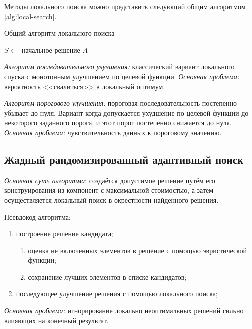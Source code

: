 Методы локального поиска можно представить следующий общим алгоритмом \ref{alg:local-search}.
\begin{algorithm}[ht!]
    \caption{Общий алгоритм локального поиска}
    \( S \leftarrow \) начальное решение \( A \)\;
    \label{alg:local-search}
\end{algorithm}

\emph{Алгоритм последовательного улучшения:} классический вариант локального спуска с монотонным 
улучшением по целевой функции. \emph{Основная проблема:} вероятность <<свалиться>> в локальный оптимум.

\emph{Алгоритм порогового улучшения:} пороговая последовательность постепенно убывает до нуля. Вариант 
когда допускается ухудшение по целевой функции до некоторого заданного порога, и этот порог постепенно 
снижается до нуля. \emph{Основная проблема:} чувствительность данных к пороговому значению.

\subsection{Жадный рандомизированный адаптивный поиск}
\emph{Основная суть алгоритма}: создаётся допустимое решение путём его конструирования из компонент с 
максимальной стоимостью, а затем осуществляется локальный поиск в окрестности найденного решения.

Псевдокод алгоритма:
\begin{enumerate}
    \item построение решение кандидата;
    \begin{enumerate}
        \item оценка не включенных элементов в решение с помощью эвристической функции;
        \item сохранение лучших элементов в списке кандидатов;
    \end{enumerate}
    \item последующее улучшение решения с помощью локального поиска;
\end{enumerate}

\emph{Основная проблема:} игнорирование локально неоптимальных решений сильно влияющих на конечный результат.

